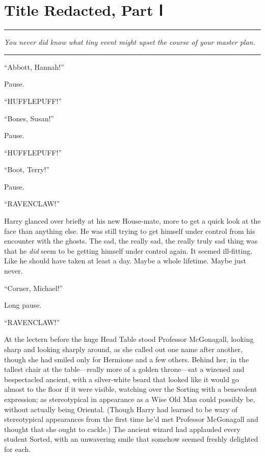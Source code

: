 \chapter{Title Redacted, Part Ⅰ}\label{title-redacted-part}

\begin{center}\rule{3in}{0.4pt}\end{center}

\emph{You never did know what tiny event might upset the course of your
master plan.}

\begin{center}\rule{3in}{0.4pt}\end{center}

``Abbott, Hannah!''

Pause.

``HUFFLEPUFF!''

``Bones, Susan!''

Pause.

``HUFFLEPUFF!''

``Boot, Terry!''

Pause.

``RAVENCLAW!''

Harry glanced over briefly at his new House-mate, more to get a quick
look at the face than anything else. He was still trying to get himself
under control from his encounter with the ghosts. The sad, the really
sad, the really truly sad thing was that he \emph{did} seem to be
getting himself under control again. It seemed ill-fitting. Like he
should have taken at least a day. Maybe a whole lifetime. Maybe just
never.

``Corner, Michael!''

Long pause.

``RAVENCLAW!''

At the lectern before the huge Head Table stood Professor McGonagall,
looking sharp and looking sharply around, as she called out one name
after another, though she had smiled only for Hermione and a few others.
Behind her, in the tallest chair at the table---really more of a golden
throne---sat a wizened and bespectacled ancient, with a silver-white
beard that looked like it would go almost to the floor if it were
visible, watching over the Sorting with a benevolent expression; as
stereotypical in appearance as a Wise Old Man could possibly be, without
actually being Oriental. (Though Harry had learned to be wary of
stereotypical appearances from the first time he'd met Professor
McGonagall and thought that she ought to cackle.) The ancient wizard had
applauded every student Sorted, with an unwavering smile that somehow
seemed freshly delighted for each.

